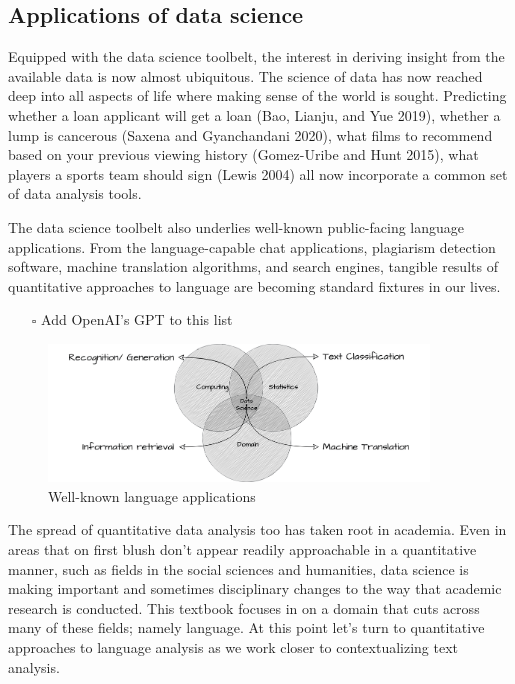 \documentclass[
  letterpaper,
]{latex/krantz}
\providecommand{\tightlist}{%
  \setlength{\itemsep}{0pt}\setlength{\parskip}{0pt}}\usepackage{longtable,booktabs,array}
\begin{document}
\hypertarget{applications-of-data-science}{%
\subsection{Applications of data
science}\label{applications-of-data-science}}

Equipped with the data science toolbelt, the interest in deriving
insight from the available data is now almost ubiquitous. The science of
data has now reached deep into all aspects of life where making sense of
the world is sought. Predicting whether a loan applicant will get a loan
(Bao, Lianju, and Yue 2019), whether a lump is cancerous (Saxena and
Gyanchandani 2020), what films to recommend based on your previous
viewing history (Gomez-Uribe and Hunt 2015), what players a sports team
should sign (Lewis 2004) all now incorporate a common set of data
analysis tools.

The data science toolbelt also underlies well-known public-facing
language applications. From the language-capable chat applications,
plagiarism detection software, machine translation algorithms, and
search engines, tangible results of quantitative approaches to language
are becoming standard fixtures in our lives.

\begin{itemize}
\tightlist
\item[$\square$]
  Add OpenAI's GPT to this list
\end{itemize}

\begin{figure}[h]

{\centering \includegraphics[width=0.9\textwidth,height=\textheight]{figures/text-analysis/ta-lang-venn.drawio.png}

}

\caption{\label{fig-intro-language-applications}Well-known language
applications}

\end{figure}

The spread of quantitative data analysis too has taken root in academia.
Even in areas that on first blush don't appear readily approachable in a
quantitative manner, such as fields in the social sciences and
humanities, data science is making important and sometimes disciplinary
changes to the way that academic research is conducted. This textbook
focuses in on a domain that cuts across many of these fields; namely
language. At this point let's turn to quantitative approaches to
language analysis as we work closer to contextualizing text analysis.
\end{document}
